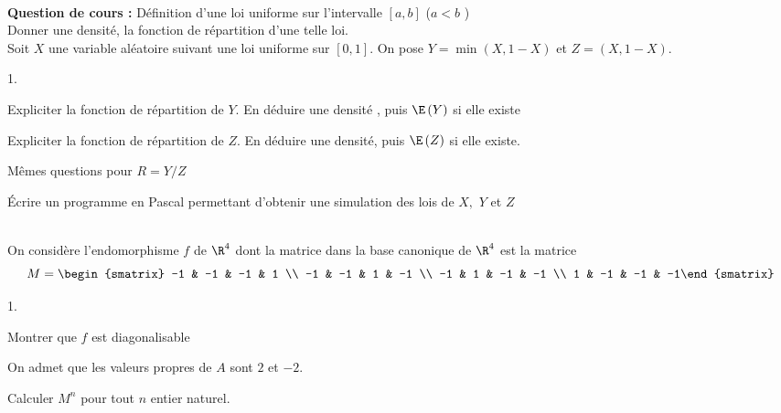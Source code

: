 \documentclass[11pt]{article}%
\begin{document}

\begin{exerciceAP}~\\
  \textbf{Question de cours :} Définition d'une loi uniforme sur
  l'intervalle $\left[ a,b\right] $ ($a<b$ )\\
  Donner une densité, la fonction de répartition d'une telle loi.
  \\
  Soit $X$ une variable aléatoire suivant une loi uniforme sur $\left[ 0,1%
  \right] $. On pose $Y=\min \left( X,1-X\right) $ et $Z=\left( X,1-X\right) $.

  \begin{noliste}{1.}
    \setlength{\itemsep}{2mm}
  \item Expliciter la fonction de répartition de $Y$. En déduire une
    densité , puis $\E\left( Y\right) $ si elle existe

  \item Expliciter la fonction de répartition de $Z$. En déduire une
    densité, puis $\E\left( Z\right) $ si elle existe. 

  \item Mêmes questions pour $R=Y/Z$

  \item Écrire un programme en Pascal permettant d'obtenir une simulation des
    lois de $X,$ $Y$ et $Z$
  \end{noliste}
\end{exerciceAP}


\begin{exerciceSP}~\\
  On considère l'endomorphisme $f$ de $\R^{4}$ dont la matrice dans la
  base canonique de $\R^{4}$ est la matrice
  \[
  M =
  \begin{smatrix}
    -1 & -1 & -1 & 1 \\
    -1 & -1 & 1 & -1 \\
    -1 & 1 & -1 & -1 \\
    1 & -1 & -1 & -1%
  \end{smatrix}%
  \]

  \begin{noliste}{1.}
    \setlength{\itemsep}{2mm}
  \item Montrer que $f$ est diagonalisable
    
  \item On admet que les valeurs propres de $A$ sont $2$ et $-2.$
    
    Calculer $M^{n}$ pour tout $n$ entier naturel.
  \end{noliste}
\end{exerciceSP}
\end{document}
